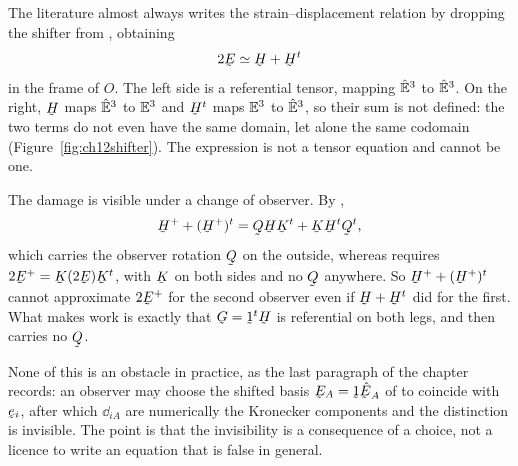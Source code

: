 \begin{remark}\label{rem:ch12shifter}
The literature almost always writes the strain--displacement relation by
dropping the shifter from , obtaining
\[
   2\bE\simeq\bH+\bH^{t}
\]
in the frame of $O$. The left side is a referential tensor, mapping
$\hat{\mathbb{E}}^{3}$ to $\hat{\mathbb{E}}^{3}$. On the right, $\bH$ maps $\hat{\mathbb{E}}^{3}$ to $\mathbb{E}^{3}$ and $\bH^{t}$
maps $\mathbb{E}^{3}$ to $\hat{\mathbb{E}}^{3}$, so their sum is not defined: the two terms do not
even have the same domain, let alone the same codomain
(Figure~\ref{fig:ch12shifter}). The expression is not a tensor equation
and cannot be one.

The damage is visible under a change of observer. By ,
\[
   \bH^{+}+(\bH^{+})^{t}=\bQ\bH\bK^{t}+\bK\bH^{t}\bQ^{t},
\]
which carries the observer rotation $\bQ$ on the outside, whereas
 requires $2\bE^{+}=\bK(2\bE)\bK^{t}$, with $\bK$ on both
sides and no $\bQ$ anywhere. So $\bH^{+}+(\bH^{+})^{t}$ cannot
approximate $2\bE^{+}$ for the second observer even if
$\bH+\bH^{t}$ did for the first. What makes  work is exactly
that $\bG=\shift^{t}\bH$ is referential on both legs, and 
then carries no $\bQ$.

None of this is an obstacle in practice, as the last paragraph of the
chapter records: an observer may choose the shifted basis
$\bE_{A}=\shift\hbE_{A}$ of  to coincide with $\be_{i}$, after
which $\dd_{iA}$ are numerically the Kronecker components and the
distinction is invisible. The point is that the invisibility is a
consequence of a choice, not a licence to write an equation that is
false in general.
\end{remark}

